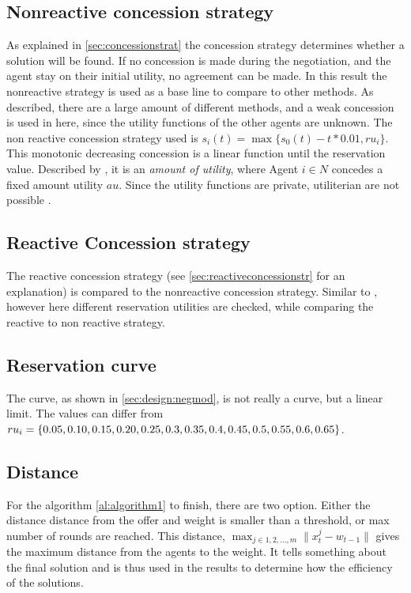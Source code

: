\subsection{Nonreactive concession strategy}
As explained in \cref{sec:concessionstrat} the concession strategy determines whether a solution will be found. If no concession is made during the negotiation, and the agent stay on their initial utility, no agreement can be made. In this result the nonreactive strategy is used as a base line to compare to other methods. As described, there are a large amount of different methods, and a weak concession is used in here, since the utility functions of the other agents are unknown. The non reactive concession strategy used is $s_i(t) = \max \{s_0(t) - t * 0.01, ru_i\}$. This monotonic decreasing concession is a linear function until the reservation value. Described by \cite{wu2009efficient}, it is an \textit{amount of utility}, where Agent $ i \in N$ concedes a fixed amount utility $au$. Since the utility functions are private, utiliterian are not possible \citep{endriss2006monotonic}.

\subsection{Reactive Concession strategy}
The reactive concession strategy (see \cref{sec:reactiveconcessionstr} for an explanation) is compared to the nonreactive concession strategy. Similar to \citet{zheng2015automated}, however here different reservation utilities are checked, while comparing the reactive to non reactive strategy.

\subsection{Reservation curve}
The curve, as shown in \cref{sec:design:negmod}, is not really a curve, but a linear limit. The values can differ from 	
$ru_i = \{0.05, 0.10, 0.15, 0.20, 0.25, 0.3, 0.35, 0.4, 0.45, 0.5, \\0.55, 0.6, 0.65\}$. 

\subsection{Distance}
For the algorithm \cref{al:algorithm1} to finish, there are two option. Either the distance distance from the offer and weight is smaller than a threshold, or max number of rounds are reached. This distance, $\max_{ j \in {1,2,...,m}} \parallel x^j_t-w_{t-1} \parallel$ gives the maximum distance from the agents to the weight. It tells something about the final solution and is thus used in the results to determine how the efficiency of the solutions.

